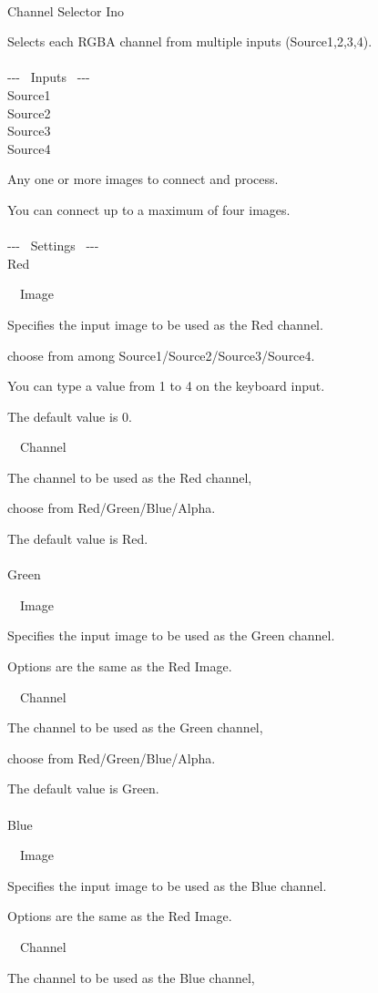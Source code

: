 \documentclass[a4paper,12pt]{article}
\begin{document}
\thispagestyle{empty}

\Large
\noindent \\
Channel Selector Ino\medskip
\par
\normalsize
Selects each RGBA channel from multiple inputs (Source1,2,3,4).\\
\\
-{-}- \ Inputs \ -{-}-\\
Source1\\
Source2\\
Source3\\
Source4\par
Any one or more images to connect and process.\par
You can connect up to a maximum of four images.\\
\\
-{-}- \ Settings \ -{-}-\\
Red\par
\noindent \ \, Image\par
Specifies the input image to be used as the Red channel.\par
choose from among Source1/Source2/Source3/Source4.\par
You can type a value from 1 to 4 on the keyboard input.\par
The default value is 0.\\
\par
\noindent \ \, Channel\par
The channel to be used as the Red channel,\par
choose from Red/Green/Blue/Alpha.\par
The default value is Red.\\
\\
Green\par
\noindent \ \, Image\par
Specifies the input image to be used as the Green channel.\par
Options are the same as the \textquotedbl Red Image\textquotedbl .\\
\par
\noindent \ \, Channel\par
The channel to be used as the Green channel,\par
choose from Red/Green/Blue/Alpha.\par
The default value is Green.\\
\\
Blue\par
\noindent \ \, Image\par
Specifies the input image to be used as the Blue channel.\par
Options are the same as the \textquotedbl Red Image\textquotedbl .\\
\par
\noindent \ \, Channel\par
The channel to be used as the Blue channel,
\end{document}
